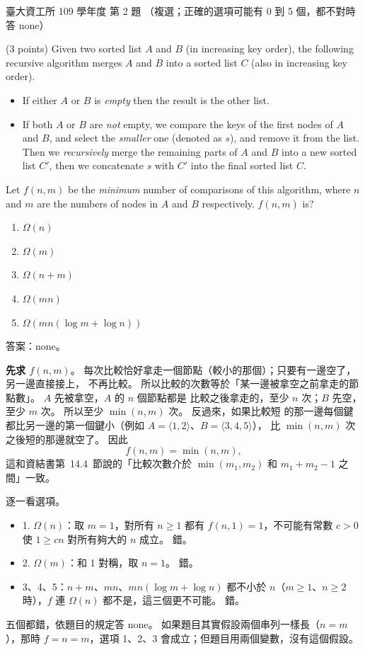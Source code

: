 \begin{pastexam}[label={px:ntu-109-dsaa-02}]{臺大資工所 109 學年度 第 2 題}
（複選；正確的選項可能有 0 到 5 個，都不對時答 none）

(3 points) Given two sorted list $A$ and $B$ (in increasing key order), the following recursive
algorithm merges $A$ and $B$ into a sorted list $C$ (also in increasing key order).
\begin{itemize}
\item If either $A$ or $B$ is \textit{empty} then the result is the other list.
\item If both $A$ or $B$ are \textit{not} empty, we compare the keys of the first nodes of $A$
and $B$, and select the \textit{smaller} one (denoted as $s$), and remove it from the list. Then
we \textit{recursively} merge the remaining parts of $A$ and $B$ into a new sorted list $C'$,
then we concatenate $s$ with $C'$ into the final sorted list $C$.
\end{itemize}
Let $f(n,m)$ be the \textit{minimum} number of comparisons of this algorithm, where $n$ and $m$
are the numbers of nodes in $A$ and $B$ respectively. $f(n,m)$ is?
\begin{enumerate}[label=\arabic*.]
\item $\Omega(n)$
\item $\Omega(m)$
\item $\Omega(n+m)$
\item $\Omega(mn)$
\item $\Omega(mn(\log m+\log n))$
\end{enumerate}
\end{pastexam}

\begin{pastsoln}
答案：none。

\textbf{先求 $f(n, m)$}。 每次比較恰好拿走一個節點（較小的那個）；只要有一邊空了，另一邊直接接上，
不再比較。 所以比較的次數等於「某一邊被拿空之前拿走的節點數」。 $A$ 先被拿空，$A$ 的 $n$ 個節點都是
比較之後拿走的，至少 $n$ 次；$B$ 先空，至少 $m$ 次。 所以至少 $\min(n, m)$ 次。 反過來，如果比較短
的那一邊每個鍵都比另一邊的第一個鍵小（例如 $A = \langle 1, 2 \rangle$、$B = \langle 3, 4, 5 \rangle$），
比 $\min(n, m)$ 次之後短的那邊就空了。 因此
\[
f(n, m) = \min(n, m),
\]
這和資結書第~14.4~節說的「比較次數介於 $\min(m_1, m_2)$ 和 $m_1 + m_2 - 1$ 之間」一致。

逐一看選項。
\begin{itemize}
\item 1. $\Omega(n)$：取 $m = 1$，對所有 $n \ge 1$ 都有 $f(n, 1) = 1$，不可能有常數 $c > 0$ 使 $1 \ge cn$
對所有夠大的 $n$ 成立。 錯。
\item 2. $\Omega(m)$：和 1 對稱，取 $n = 1$。 錯。
\item 3、4、5：$n + m$、$mn$、$mn(\log m + \log n)$ 都不小於 $n$（$m \ge 1$、$n \ge 2$ 時），$f$ 連
$\Omega(n)$ 都不是，這三個更不可能。 錯。
\end{itemize}
五個都錯，依題目的規定答 none。 如果題目其實假設兩個串列一樣長（$n = m$），那時 $f = n = m$，選項
1、2、3 會成立；但題目用兩個變數，沒有這個假設。
\end{pastsoln}
